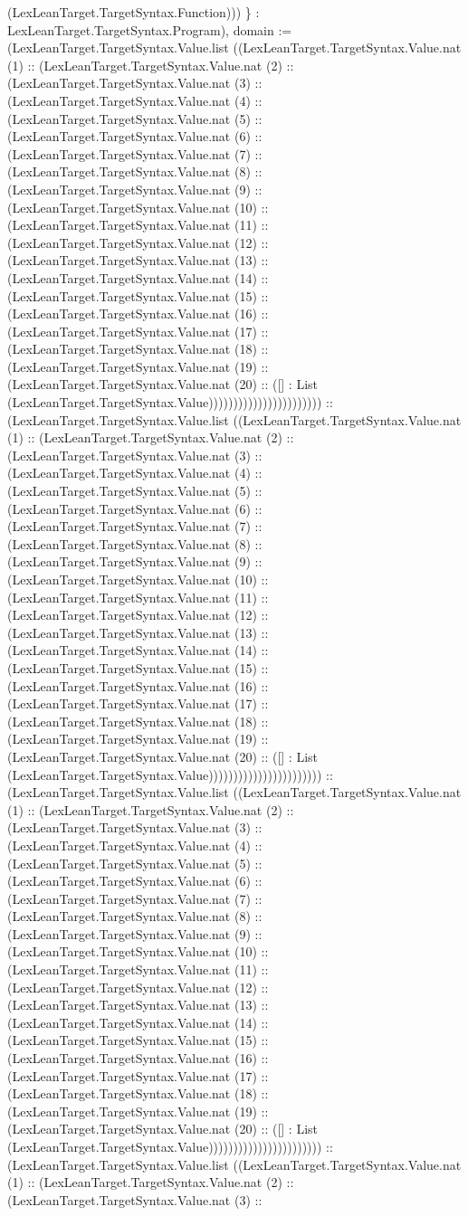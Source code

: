 \documentclass[11pt]{article}
\begin{document}
(LexLeanTarget.TargetSyntax.Function))) \} : LexLeanTarget.TargetSyntax.Program), domain := (LexLeanTarget.TargetSyntax.Value.list ((LexLeanTarget.TargetSyntax.Value.nat (1) :: (LexLeanTarget.TargetSyntax.Value.nat (2) :: (LexLeanTarget.TargetSyntax.Value.nat (3) :: (LexLeanTarget.TargetSyntax.Value.nat (4) :: (LexLeanTarget.TargetSyntax.Value.nat (5) :: (LexLeanTarget.TargetSyntax.Value.nat (6) :: (LexLeanTarget.TargetSyntax.Value.nat (7) :: (LexLeanTarget.TargetSyntax.Value.nat (8) :: (LexLeanTarget.TargetSyntax.Value.nat (9) :: (LexLeanTarget.TargetSyntax.Value.nat (10) :: (LexLeanTarget.TargetSyntax.Value.nat (11) :: (LexLeanTarget.TargetSyntax.Value.nat (12) :: (LexLeanTarget.TargetSyntax.Value.nat (13) :: (LexLeanTarget.TargetSyntax.Value.nat (14) :: (LexLeanTarget.TargetSyntax.Value.nat (15) :: (LexLeanTarget.TargetSyntax.Value.nat (16) :: (LexLeanTarget.TargetSyntax.Value.nat (17) :: (LexLeanTarget.TargetSyntax.Value.nat (18) :: (LexLeanTarget.TargetSyntax.Value.nat (19) :: (LexLeanTarget.TargetSyntax.Value.nat (20) :: ([] : List (LexLeanTarget.TargetSyntax.Value))))))))))))))))))))))) :: (LexLeanTarget.TargetSyntax.Value.list ((LexLeanTarget.TargetSyntax.Value.nat (1) :: (LexLeanTarget.TargetSyntax.Value.nat (2) :: (LexLeanTarget.TargetSyntax.Value.nat (3) :: (LexLeanTarget.TargetSyntax.Value.nat (4) :: (LexLeanTarget.TargetSyntax.Value.nat (5) :: (LexLeanTarget.TargetSyntax.Value.nat (6) :: (LexLeanTarget.TargetSyntax.Value.nat (7) :: (LexLeanTarget.TargetSyntax.Value.nat (8) :: (LexLeanTarget.TargetSyntax.Value.nat (9) :: (LexLeanTarget.TargetSyntax.Value.nat (10) :: (LexLeanTarget.TargetSyntax.Value.nat (11) :: (LexLeanTarget.TargetSyntax.Value.nat (12) :: (LexLeanTarget.TargetSyntax.Value.nat (13) :: (LexLeanTarget.TargetSyntax.Value.nat (14) :: (LexLeanTarget.TargetSyntax.Value.nat (15) :: (LexLeanTarget.TargetSyntax.Value.nat (16) :: (LexLeanTarget.TargetSyntax.Value.nat (17) :: (LexLeanTarget.TargetSyntax.Value.nat (18) :: (LexLeanTarget.TargetSyntax.Value.nat (19) :: (LexLeanTarget.TargetSyntax.Value.nat (20) :: ([] : List (LexLeanTarget.TargetSyntax.Value))))))))))))))))))))))) :: (LexLeanTarget.TargetSyntax.Value.list ((LexLeanTarget.TargetSyntax.Value.nat (1) :: (LexLeanTarget.TargetSyntax.Value.nat (2) :: (LexLeanTarget.TargetSyntax.Value.nat (3) :: (LexLeanTarget.TargetSyntax.Value.nat (4) :: (LexLeanTarget.TargetSyntax.Value.nat (5) :: (LexLeanTarget.TargetSyntax.Value.nat (6) :: (LexLeanTarget.TargetSyntax.Value.nat (7) :: (LexLeanTarget.TargetSyntax.Value.nat (8) :: (LexLeanTarget.TargetSyntax.Value.nat (9) :: (LexLeanTarget.TargetSyntax.Value.nat (10) :: (LexLeanTarget.TargetSyntax.Value.nat (11) :: (LexLeanTarget.TargetSyntax.Value.nat (12) :: (LexLeanTarget.TargetSyntax.Value.nat (13) :: (LexLeanTarget.TargetSyntax.Value.nat (14) :: (LexLeanTarget.TargetSyntax.Value.nat (15) :: (LexLeanTarget.TargetSyntax.Value.nat (16) :: (LexLeanTarget.TargetSyntax.Value.nat (17) :: (LexLeanTarget.TargetSyntax.Value.nat (18) :: (LexLeanTarget.TargetSyntax.Value.nat (19) :: (LexLeanTarget.TargetSyntax.Value.nat (20) :: ([] : List (LexLeanTarget.TargetSyntax.Value))))))))))))))))))))))) :: (LexLeanTarget.TargetSyntax.Value.list ((LexLeanTarget.TargetSyntax.Value.nat (1) :: (LexLeanTarget.TargetSyntax.Value.nat (2) :: (LexLeanTarget.TargetSyntax.Value.nat (3) :: 
\end{document}
